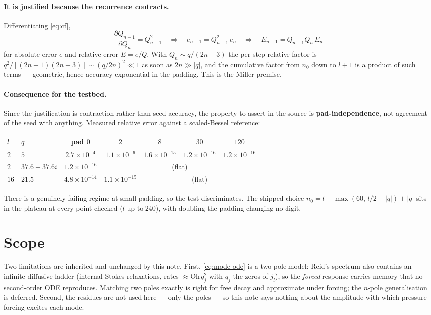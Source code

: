 \documentclass[11pt]{article}
\newcommand{\Oh}{\mathrm{Oh}}
\begin{document}
\paragraph{It is justified because the recurrence contracts.} Differentiating \eqref{eq:cf},
\begin{equation}
  \frac{\partial Q_{n-1}}{\partial Q_n} = Q_{n-1}^2
  \quad\Longrightarrow\quad
  e_{n-1} = Q_{n-1}^2\,e_n
  \quad\Longrightarrow\quad
  E_{n-1} = Q_{n-1}Q_n\,E_n
  \label{eq:contraction}
\end{equation}
for absolute error $e$ and relative error $E=e/Q$. With $Q_n\sim q/(2n+3)$ the per-step
relative factor is $q^2/[(2n+1)(2n+3)]\sim(q/2n)^2\ll1$ as soon as $2n\gg|q|$, and the
cumulative factor from $n_0$ down to $l+1$ is a product of such terms --- geometric, hence
accuracy exponential in the padding. This is the Miller premise.

\paragraph{Consequence for the testbed.} Since the justification is contraction rather than
seed accuracy, the property to assert in the source is \textbf{pad-independence}, not
agreement of the seed with anything. Measured relative error against a scaled-Bessel reference:

\begin{center}
\begin{tabular}{llccccc}
\toprule
$l$ & $q$ & pad $0$ & $2$ & $8$ & $30$ & $120$ \\
\midrule
$2$ & $5$ & $2.7\!\times\!10^{-4}$ & $1.1\!\times\!10^{-6}$ & $1.6\!\times\!10^{-15}$ & $1.2\!\times\!10^{-16}$ & $1.2\!\times\!10^{-16}$ \\
$2$ & $37.6+37.6i$ & $1.2\!\times\!10^{-16}$ & \multicolumn{4}{c}{(flat)} \\
$16$ & $21.5$ & $4.8\!\times\!10^{-14}$ & $1.1\!\times\!10^{-15}$ & \multicolumn{3}{c}{(flat)} \\
\bottomrule
\end{tabular}
\end{center}

There is a genuinely failing regime at small padding, so the test discriminates. The shipped
choice $n_0 = l + \max(60,\,l/2+|q|) + |q|$ sits in the plateau at every point checked
($l$ up to $240$), with doubling the padding changing no digit.

\section{Scope}

Two limitations are inherited and unchanged by this note. First, \eqref{eq:mode-ode} is a
two-pole model: Reid's spectrum also contains an infinite diffusive ladder (internal Stokes
relaxations, rates $\approx\Oh\,q_j^2$ with $q_j$ the zeros of $j_l$), so the \emph{forced}
response carries memory that no second-order ODE reproduces. Matching two poles exactly is
right for free decay and approximate under forcing; the $n$-pole generalisation is deferred.
Second, the residues are not used here --- only the poles --- so this note says nothing about
the amplitude with which pressure forcing excites each mode.
\end{document}
